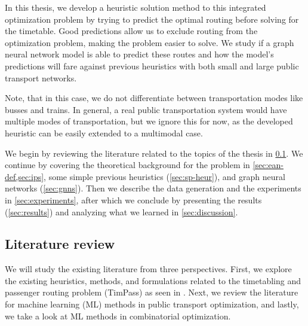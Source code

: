 \documentclass[english, 12pt, a4paper, sci, utf8, a-2b, online]{aaltothesis}
\begin{document}
In this thesis, we develop a heuristic solution method to this integrated optimization problem by trying to predict the optimal routing before solving for the timetable. Good predictions allow us to exclude routing from the optimization problem, making the problem easier to solve. We study if a graph neural network model is able to predict these routes and how the model's predictions will fare against previous heuristics with both small and large public transport networks.

Note, that in this case, we do not differentiate between transportation modes
like busses and trains. In general, a real public transportation system would have multiple modes of transportation, but we ignore this for now, as the developed heuristic can be easily extended to a multimodal case. 

We begin by reviewing the literature related to the topics of the thesis in \cref{sec:lit-review}. We continue by covering the theoretical background for the problem in \cref{sec:ean-def,sec:ips}, some simple previous heuristics (\cref{sec:sp-heur}), and graph neural networks (\cref{sec:gnns}). Then we describe the data generation and the experiments in \cref{sec:experiments}, after which we conclude by presenting the results (\cref{sec:results}) and analyzing what we learned in \cref{sec:discussion}.

\subsection{Literature review}\label{sec:lit-review}


We will study the existing literature from three perspectives. First, we explore the existing heuristics, methods, and formulations related to the timetabling and passenger routing problem (TimPass) as seen in \cite{timpass-original-2014,schiewe2020periodic}. Next, we review the literature for machine learning (ML) methods in public transport optimization, and lastly, we take a look at ML methods in combinatorial optimization.



\end{document}
